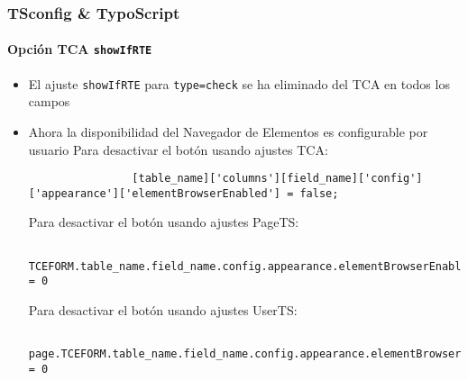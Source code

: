 \begin{frame}[fragile]
	\frametitle{TSconfig \& TypoScript}
	\framesubtitle{Opción TCA \texttt{showIfRTE}}

	\lstset{basicstyle=\tiny\ttfamily}

	\begin{itemize}
		\item El ajuste \texttt{showIfRTE} para \texttt{type=check} se ha eliminado del TCA en todos los campos
		\item Ahora la disponibilidad del Navegador de Elementos es configurable por usuario \newline
			\smaller
				Para desactivar el botón usando ajustes TCA:
			\normalsize

			\begin{lstlisting}
				[table_name]['columns'][field_name]['config']['appearance']['elementBrowserEnabled'] = false;
			\end{lstlisting}

			\smaller
				Para desactivar el botón usando ajustes PageTS:
			\normalsize

			\begin{lstlisting}
				TCEFORM.table_name.field_name.config.appearance.elementBrowserEnabled = 0
			\end{lstlisting}

			\smaller
				Para desactivar el botón usando ajustes UserTS:
			\normalsize

			\begin{lstlisting}
				page.TCEFORM.table_name.field_name.config.appearance.elementBrowserEnabled = 0
			\end{lstlisting}

	\end{itemize}

\end{frame}


